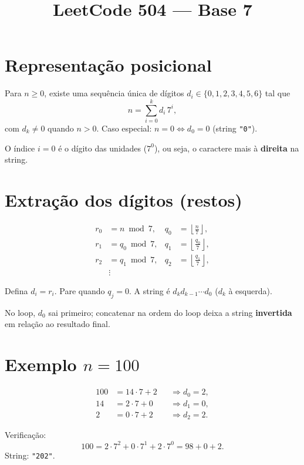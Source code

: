 \documentclass[11pt]{article}
\title{LeetCode 504 --- Base 7}
\author{}
\date{}
\begin{document}
\maketitle

\section{Representação posicional}

Para $n \ge 0$, existe uma sequência única de dígitos $d_i \in \{0,1,2,3,4,5,6\}$ tal que
\[
  n = \sum_{i=0}^{k} d_i \, 7^{i},
\]
com $d_k \neq 0$ quando $n > 0$. Caso especial: $n = 0 \Leftrightarrow d_0 = 0$ (string \texttt{"0"}).

O índice $i = 0$ é o dígito das unidades ($7^0$), ou seja, o caractere mais à \textbf{direita} na string.

\section{Extração dos dígitos (restos)}

\[
\begin{aligned}
  r_0 &= n \bmod 7, & q_0 &= \left\lfloor \frac{n}{7} \right\rfloor, \\
  r_1 &= q_0 \bmod 7, & q_1 &= \left\lfloor \frac{q_0}{7} \right\rfloor, \\
  r_2 &= q_1 \bmod 7, & q_2 &= \left\lfloor \frac{q_1}{7} \right\rfloor, \\
  &\vdots & &
\end{aligned}
\]

Defina $d_i = r_i$. Pare quando $q_j = 0$. A string é $d_k d_{k-1} \cdots d_0$ ($d_k$ à esquerda).

No loop, $d_0$ sai primeiro; concatenar na ordem do loop deixa a string \textbf{invertida} em relação ao resultado final.

\section{Exemplo $n = 100$}

\[
\begin{aligned}
  100 &= 14 \cdot 7 + 2 &&\Rightarrow d_0 = 2, \\
  14 &= 2 \cdot 7 + 0 &&\Rightarrow d_1 = 0, \\
  2 &= 0 \cdot 7 + 2 &&\Rightarrow d_2 = 2.
\end{aligned}
\]

Verificação:
\[
  100 = 2 \cdot 7^{2} + 0 \cdot 7^{1} + 2 \cdot 7^{0} = 98 + 0 + 2.
\]
String: \texttt{"202"}.
\end{document}
